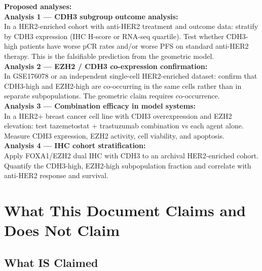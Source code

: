 \documentclass[12pt, a4paper]{article}
\begin{document}
\begin{center}
\colorbox{actionbox}{
\begin{minipage}{0.88\textwidth}
\vspace{0.5em}
\textbf{Proposed analyses:}\\[0.4em]
\textbf{Analysis 1 --- CDH3 subgroup
outcome analysis:}\\
In a HER2-enriched cohort with anti-HER2
treatment and outcome data: stratify by
CDH3 expression (IHC H-score or RNA-seq
quartile). Test whether CDH3-high patients
have worse pCR rates and/or worse PFS
on standard anti-HER2 therapy.
This is the falsifiable prediction from
the geometric model.\\[0.5em]
\textbf{Analysis 2 --- EZH2 / CDH3
co-expression confirmation:}\\
In GSE176078 or an independent single-cell
HER2-enriched dataset: confirm that CDH3-high
and EZH2-high are co-occurring in the same
cells rather than in separate subpopulations.
The geometric claim requires co-occurrence.\\[0.5em]
\textbf{Analysis 3 --- Combination
efficacy in model systems:}\\
In a HER2+ breast cancer cell line with
CDH3 overexpression and EZH2 elevation:
test tazemetostat + trastuzumab combination
vs each agent alone. Measure CDH3 expression,
EZH2 activity, cell viability, and apoptosis.\\[0.5em]
\textbf{Analysis 4 --- IHC cohort
stratification:}\\
Apply FOXA1/EZH2 dual IHC with CDH3 to
an archival HER2-enriched cohort. Quantify
the CDH3-high, EZH2-high subpopulation
fraction and correlate with anti-HER2
response and survival.
\vspace{0.5em}
\end{minipage}}
\end{center}

\section{What This Document Claims and Does
Not Claim}

\subsection{What IS Claimed}
\end{document}
